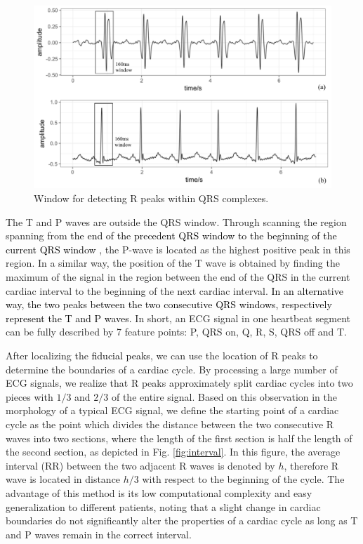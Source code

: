 \begin{figure}[t]
\centering
\includegraphics[scale=.5]{Fig/window.pdf}
\caption{Window for detecting R peaks within QRS complexes.}
\label{fig:window}
\end{figure}


The T and P waves are outside the QRS window. Through scanning the region spanning from \textcolor{black}{the end of the precedent QRS window to the beginning of the current QRS window}%
, the P-wave is located as the highest positive peak in this region. In a similar way, the position of the T wave is obtained by finding the maximum of the signal in the region between the end of the QRS in the current cardiac interval to the beginning of the next cardiac interval. \textcolor{black}{In an alternative way, the two peaks between the two consecutive QRS windows, respectively represent the T and P waves.}
In short, an ECG signal in one heartbeat segment can be fully described by 7 feature points: P, QRS on, Q, R, S, QRS off and T. 

After localizing the \textcolor{black}{fiducial peaks}, we can use the location of R peaks to determine the boundaries of a cardiac cycle. %
By processing a large number of ECG signals, we realize that R peaks approximately split cardiac cycles into two pieces with $1/3$ and $2/3$ of the entire signal\cite{2012qrs}. %
Based on this observation in the morphology of a typical ECG signal, we define the starting point of a cardiac cycle as the point which divides the distance between the two consecutive R waves into two sections, where the length of the first section is half the length of the second section, as depicted in Fig. \ref{fig:interval}. In this figure, the average interval (RR) between the two adjacent R waves is denoted by $h$, therefore R wave is located in distance $h/3$ with respect to the beginning of the cycle. The advantage of this method is its low computational complexity and easy generalization to different patients, noting that a slight change in cardiac boundaries do not significantly alter the properties of a cardiac cycle as long as T and P waves remain in the correct interval. 

